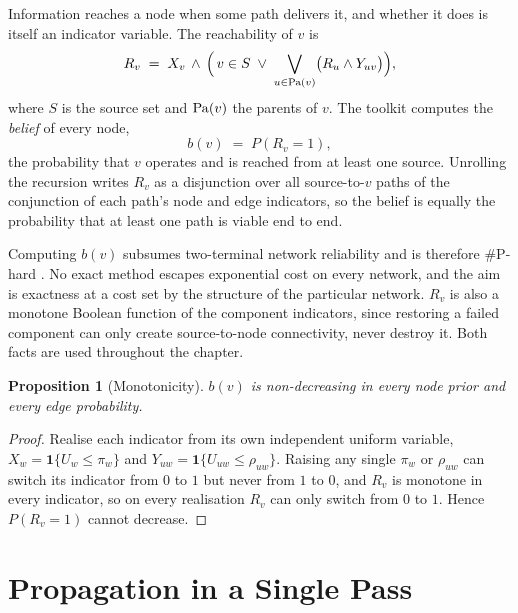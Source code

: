 \documentclass[12pt]{report}
\newtheorem{proposition}[theorem]{Proposition}
\begin{document}
Information reaches a node when some path delivers it, and whether it does is itself an indicator variable. The reachability of $v$ is
\begin{equation}
\label{eq:pp-indicator}
R_v \;=\; X_v \,\wedge\, \Bigl(\, v \in S \;\vee\; \bigvee_{u \in \mathrm{Pa}(v)} \bigl( R_u \wedge Y_{uv} \bigr) \Bigr),
\end{equation}
where $S$ is the source set and $\mathrm{Pa}(v)$ the parents of $v$. The toolkit computes the \emph{belief} of every node,
\begin{equation}
\label{eq:pp-belief}
b(v) \;=\; P(R_v = 1),
\end{equation}
the probability that $v$ operates and is reached from at least one source. Unrolling the recursion writes $R_v$ as a disjunction over all source-to-$v$ paths of the conjunction of each path's node and edge indicators, so the belief is equally the probability that at least one path is viable end to end.

Computing $b(v)$ subsumes two-terminal network reliability and is therefore \#P-hard \cite{valiant1979complexity,ball1986computational}. No exact method escapes exponential cost on every network, and the aim is exactness at a cost set by the structure of the particular network. $R_v$ is also a monotone Boolean function of the component indicators, since restoring a failed component can only create source-to-node connectivity, never destroy it. Both facts are used throughout the chapter.

\begin{proposition}[Monotonicity]
\label{prop:pp-monotone}
$b(v)$ is non-decreasing in every node prior and every edge probability.
\end{proposition}

\begin{proof}
Realise each indicator from its own independent uniform variable, $X_w = \mathbf{1}\{U_w \le \pi_w\}$ and $Y_{uw} = \mathbf{1}\{U_{uw} \le \rho_{uw}\}$. Raising any single $\pi_w$ or $\rho_{uw}$ can switch its indicator from $0$ to $1$ but never from $1$ to $0$, and $R_v$ is monotone in every indicator, so on every realisation $R_v$ can only switch from $0$ to $1$. Hence $P(R_v = 1)$ cannot decrease.
\end{proof}

\section{Propagation in a Single Pass}
\label{sec:pp-pass}
\end{document}
